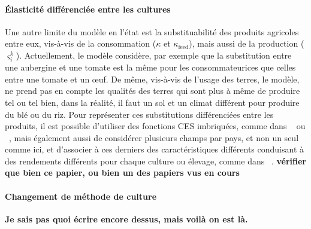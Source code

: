 \paragraph{Élasticité différenciée entre les cultures} Une autre limite du modèle en l’état est la substituabilité des produits agricoles entre eux, vis-à-vis de la consommation ($\kappa$ et $\kappa_\text{feed}$), mais aussi de la production ($\varsigma_i^k$). Actuellement, le modèle considère, par exemple que la substitution entre une aubergine et une tomate est la même pour les consommateurices que celles entre une tomate et un œuf. De même, vis-à-vis de l’usage des terres, le modèle, ne prend pas en compte les qualités des terres qui sont plus à même de produire tel ou tel bien, dans la réalité, il faut un sol et un climat différent pour produire du blé ou du riz. Pour représenter ces substitutions différenciées entre les produits, il est possible d’utiliser des fonctions CES imbriquées, comme dans ~\cite{CorreaDias2025} ou ~\cite{Valin2023}, mais également aussi de considérer plusieurs champs par pays, et non un seul comme ici, et d’associer à ces derniers des caractéristiques différents conduisant à des rendements différents pour chaque culture ou élevage, comme dans ~\cite{Gouel2021}. \textbf{vérifier que bien ce papier, ou bien un des papiers vus en cours}

\paragraph{Changement de méthode de culture} \textbf{Je sais pas quoi écrire encore dessus, mais voilà on est là.}
